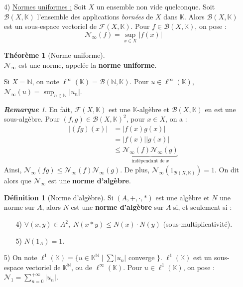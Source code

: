 \documentclass[12pt]{book}
\let\ensembleNombre\mathbb
\newcommand*\N{\ensuremath{\ensembleNombre{N}}}
\newcommand*\K{\ensuremath{\ensembleNombre{K}}}
\newcommand*\B{\ensuremath{\mathcal B}}
\theoremstyle{definition}
\newtheorem*{defi}{Définition}
\newtheorem{thme}{Théorème}[chapter]
\theoremstyle{remark}
\newtheorem*{rem}{\textbf{Remarque}}
\newenvironment{fdef}
  {\begin{mdframed}[roundcorner=10pt, linewidth=1pt]\begin{defi}}
  {\end{defi}\end{mdframed}}
\newenvironment{fthme}
  {\begin{mdframed}[roundcorner=10pt, linewidth=2pt]\begin{thme}}
  {\end{thme}\end{mdframed}}
\begin{document}
\begin{itemize}
	\item[4)] \underline{Normes uniformes :} Soit $X$ un ensemble non vide quelconque. Soit $\B(X,\K)$ l'ensemble des applications \textit{bornées} de $X$ dans $\K$. Alors $\B(X, \K)$ est un sous-espace vectoriel de $\mathcal F(X, \K)$. Pour $f \in \B(X, \K)$, on pose :
	\[ \boxed{ \mathcal N_{\infty} (f) = \sup_{x \in X} |f(x)|} \]
	
	\begin{fthme}[Norme uniforme]\mbox{~}\\
	$\mathcal N_{\infty}$ est une norme, appelée la \textbf{norme uniforme}.
	\end{fthme}
	
	Si $X = \N$, on note $\ell^\infty(\K) = \B(\N, \K)$. Pour $u \in \ell^\infty (\K)$, $\mathcal N_\infty (u) = \sup_{n\in \N} |u_n|$.
	
	\begin{rem}
	En fait, $\mathcal F(X, \K)$ est une $\K$-algèbre et $\B(X, \K)$ en est une sous-algèbre. Pour $(f,g) \in \B(X, \K)^2$, pour $x \in X$, on a :
		\begin{align*}
		|(fg)(x)| &= |f(x) g(x)| \\
		&= |f(x)||g(x)| \\
		&\leq \underbrace{\mathcal N_\infty (f) \mathcal N_\infty (g)}_{\text{indépendant de } x}
		\end{align*}
	Ainsi, $\mathcal N_\infty (fg) \leq \mathcal N_\infty (f) \mathcal N_\infty (g)$. De plus, $\mathcal N_\infty (1_{\B(X, \K)}) = 1$. On dit alors que $\mathcal N_\infty$ est une \textbf{norme d'algèbre}.
	\end{rem}	
	\begin{fdef}[Norme d'algèbre]
	Si $(A, +, \cdot, *)$ est une algèbre et $N$ une norme sur $A$, alors $N$ est une \textbf{norme d'algèbre} sur $A$ si, et seulement si :
	\begin{itemize}
	\item[4)] $\forall (x,y) \in A^2,\; N(x * y) \leq N(x) \cdot N(y)$ (sous-multiplicativité).
	\item[5)] $N(1_A) = 1$.
	\end{itemize}
	\end{fdef}
	
	\item[5)] On note $\ell^1(\K) = \lbrace u \in \K^\N \;|\; \sum |u_n|$ converge $\rbrace$. $\ell^1(\K)$ est un sous-espace vectoriel de $\K^\N$, ou de $\ell^\infty(\K)$. Pour $u \in \ell^1(\K)$, on pose : $\mathcal N_1 = \sum_{n=0}^{+\infty} |u_n|$.
	

\end{itemize}
\end{document}
